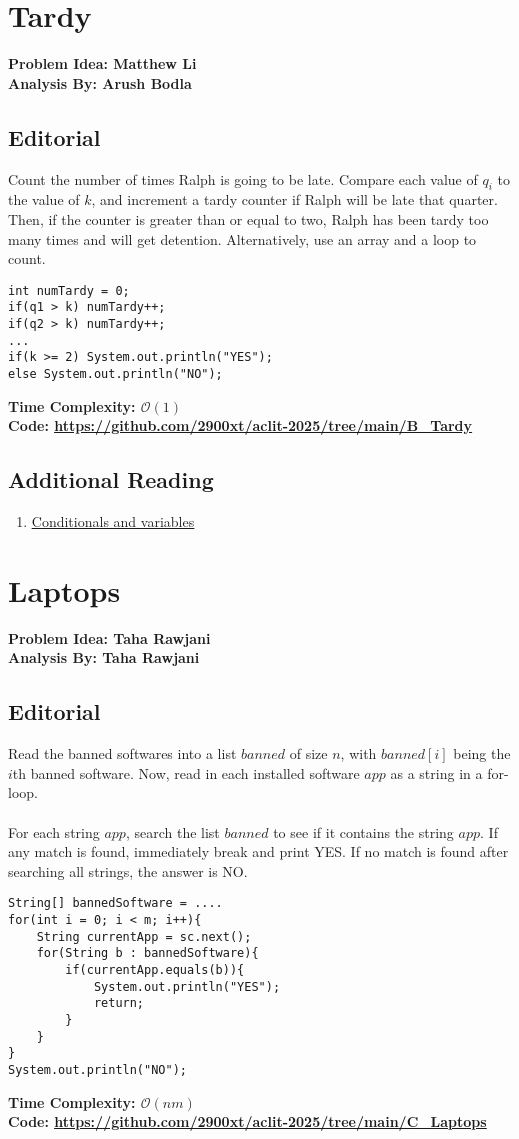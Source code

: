 \documentclass{article}
\newcommand{\link}[1]{\textcolor{blue!50!black}{\uline{\url{#1}}}}
\newcommand{\namelink}[2]{\textcolor{blue!50!black}{\uline{\href{#1}{#2}}}}
\begin{document}
\section{Tardy}
\textbf{Problem Idea: Matthew Li\\ Analysis By: Arush Bodla}
\subsection{Editorial}
Count the number of times Ralph is going to be late. Compare each value of $q_i$ to the value of $k$, and increment a tardy counter if Ralph will be late that quarter. Then, if the counter is greater than or equal to two, Ralph has been tardy too many times and will get detention. Alternatively, use an array and a loop to count. 

\begin{lstlisting}
int numTardy = 0;
if(q1 > k) numTardy++;
if(q2 > k) numTardy++;
...
if(k >= 2) System.out.println("YES");
else System.out.println("NO");
\end{lstlisting}
\textbf{Time Complexity: $\mathcal{O}(1)$}\\
\textbf{Code: \link{https://github.com/2900xt/aclit-2025/tree/main/B_Tardy}}
\subsection{Additional Reading}
\begin{enumerate}
    \item \namelink{https://codelearn.com/blog/conditionals-loops-variables-and-functions/}{Conditionals and variables}
\end{enumerate}
\newpage
\section{Laptops}
\textbf{Problem Idea: Taha Rawjani\\ Analysis By: Taha Rawjani}
\subsection{Editorial}
Read the banned softwares into a list $banned$ of size $n$, with $banned[i]$ being the $i$th banned software. Now, read in each installed software $app$ as a string in a for-loop. \\\\
For each string $app$, search the list $banned$ to see if it contains the string $app$. If any match is found, immediately break and print YES. If no match is found after searching all strings, the answer is NO.
\begin{lstlisting}
String[] bannedSoftware = ....
for(int i = 0; i < m; i++){
    String currentApp = sc.next();
    for(String b : bannedSoftware){
        if(currentApp.equals(b)){
            System.out.println("YES");
            return;
        }
    }
}
System.out.println("NO");
\end{lstlisting}
\textbf{Time Complexity: $\mathcal{O}(nm)$}\\
\textbf{Code: \link{https://github.com/2900xt/aclit-2025/tree/main/C_Laptops}}
\end{document}
